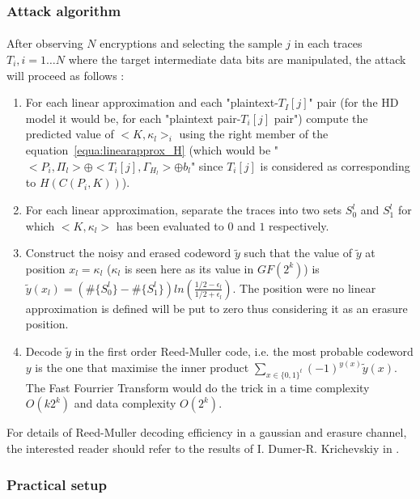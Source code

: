 \documentclass[11pt,a4paper]{article}
\begin{document}
{{{{{{{{{\subsubsection{Attack algorithm}
\label{subsubsec:MLPAalgorithm}
\paragraph{}
After observing $N$ encryptions and selecting the sample $j$ in each traces $T_i, i=1\dots N$ where the target intermediate data bits are manipulated, the attack will proceed as follows :
\begin{enumerate}
\item For each linear approximation and each "plaintext-$T_I[j]$" pair (for the HD model it would be, for each "plaintext pair-$T_i[j]$ pair")
compute the predicted value of $<K,\kappa_l>_i$ using the right member of the equation~\ref{equa:linearapprox_H}
(which would be "$<P_i,\Pi_l> \oplus <T_i[j], \Gamma_{H_l}> \oplus b_l$" since $T_i[j]$ is considered as corresponding to $H(C(P_i,K))$).
\item For each linear approximation, separate the traces into two sets $S_0^l$ and $S_1^l$ for which $<K,\kappa_l>$ has been evaluated to $0$ and $1$ respectively. 
\item Construct the noisy and erased codeword $\tilde{y}$  such that the value of $\tilde{y}$ at position $x_l = \kappa_l$ ($\kappa_l$ is seen here as its value in $GF(2^k)$) is 
$\tilde{y}(x_l) = (\#\{S_0^l\}-\#\{S_1^l\}) ln(\frac{1/2 - \epsilon_l}{1/2 + \epsilon_l}) $. The position were no linear approximation is defined will be put to zero thus considering it 
as an erasure position. 
\item Decode $\tilde{y}$ in the first order Reed-Muller code, i.e. the most probable codeword $y$ is the one that maximise the inner product $\sum_{x\in \{0,1\}^t}(-1)^{y(x)}\tilde{y}(x)$. 
The Fast Fourrier Transform would do the trick in a time complexity $O(k2^k)$ and data complexity $O(2^k)$.
\end{enumerate}
For details of Reed-Muller decoding efficiency in a gaussian and erasure channel, the interested reader should refer to the results of I. Dumer-R. Krichevskiy in 
\cite{DumerKrichevskiy00}. 

\subsubsection{Practical setup} 
\label{subsubsec:practicalsetup}
}}}}}}}}}
\end{document}
